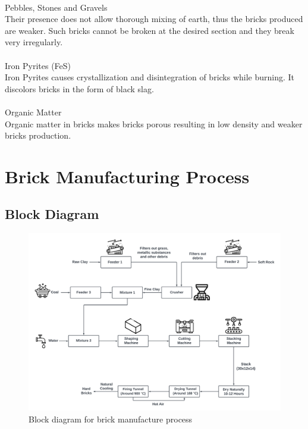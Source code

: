 \documentclass{article}
\begin{document}
\vspace{0.1cm}\\
Pebbles, Stones and Gravels\\
Their presence does not allow thorough mixing of earth, thus the bricks produced are weaker. Such bricks cannot be broken at the desired section and they break very irregularly.\\
\vspace{0.1cm}\\
Iron Pyrites (FeS)\\
Iron Pyrites causes crystallization and disintegration of bricks while burning. It discolors bricks in the form of black slag.\\
\vspace{0.1cm}\\
Organic Matter\\
Organic matter in bricks makes bricks porous resulting in low density and weaker bricks production.\\

\newpage
\section{Brick Manufacturing Process}

\subsection{Block Diagram}
\begin{figure}[h]
  \centering
  \includegraphics[width=1\textwidth]{img/blank diagram.png}
  \caption{Block diagram for brick manufacture process}
\end{figure}
\end{document}
